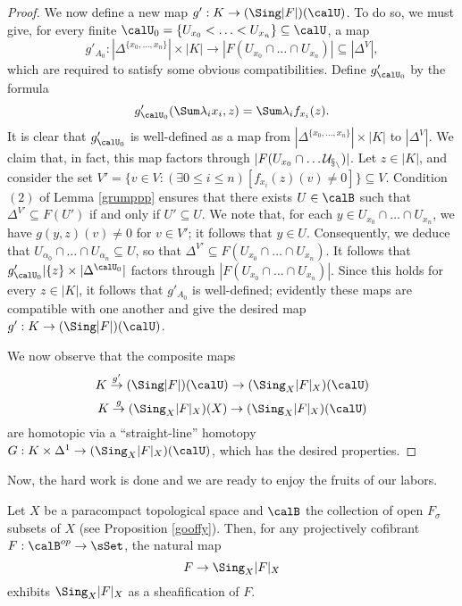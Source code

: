 \begin{proof}
We now define a new map
$g': K \rightarrow (\Sing |F|)(\calU)$. To do so, we must give, for every finite
$\calU_0 = \{ U_{x_0} < \ldots < U_{x_n} \} \subseteq \calU$, a map
$$ g'_{A_0}: |\Delta^{ \{x_0, \ldots, x_n\} }| \times |K| \rightarrow |F(U_{x_0} \cap \ldots \cap U_{x_n})| \subseteq |\Delta^V|,$$
which are required to satisfy some obvious compatibilities. 
Define $g'_{\calU_0}$ by the formula
$$ g'_{\calU_0}( \Sum \lambda_i x_i, z) = \Sum \lambda_i f_{x_i}(z).$$
It is clear that $g'_{\calU_0}$ is well-defined as a map from $| \Delta^{ \{x_0, \ldots, x_n \} } | \times |K|$ to
$| \Delta^{V} |$. We claim that, in fact, this map factors through $| F( U_{x_0} \cap \ldots \cal U_{x_n} )|$. Let $z \in |K|$, and consider the set $V' = \{ v \in V: (\exists 0 \leq i \leq n) [f_{x_i}(z)(v) \neq 0] \} \subseteq V$. Condition $(2)$ of Lemma \ref{grumppp} ensures that there exists $U \in \calB$ such that $\Delta^{V'} \subseteq F(U')$ if and only if
$U' \subseteq U$. We note that, for each $y \in U_{x_0} \cap \ldots \cap U_{x_n}$, we have $g(y,z)(v) \neq 0$ for $v \in V'$; it follows that $y \in U$. Consequently, we deduce that
$U_{\alpha_0} \cap \ldots \cap U_{\alpha_n} \subseteq U$, so that
$\Delta^{V'} \subseteq F( U_{x_0} \cap \ldots \cap U_{x_n} ).$ It follows that
$g'_{\calU_0}| \{z\} \times |\Delta^{\calU_0}|$ factors through $| F(U_{x_0} \cap \ldots \cap U_{x_n} )|$. Since this holds for every $z \in |K|$, it follows that $g'_{A_0}$ is well-defined; evidently these maps are compatible with one another and give the desired map $g': K \rightarrow (\Sing |F|)(\calU)$.

We now observe that the composite maps
$$ K \stackrel{g'}{\rightarrow } (\Sing |F|)(\calU) \rightarrow (\Sing_{X} |F|_X)(\calU)$$
$$ K \stackrel{g}{\rightarrow } (\Sing_X |F|_X)(X) \rightarrow (\Sing_X |F|_X)(\calU)$$
are homotopic via a ``straight-line'' homotopy 
$G: K \times \Delta^1 \rightarrow (\Sing_X |F|_X)(\calU)$, which has the desired properties.
\end{proof}

Now, the hard work is done and we are ready to enjoy the fruits of our labors.

\begin{theorem}\label{main}
Let $X$ be a paracompact topological space and $\calB$ the collection of open
$F_{\sigma}$ subsets of $X$ (see Proposition \ref{gooffy}). Then, for any
projectively cofibrant $F: \calB^{op} \rightarrow \sSet$, the natural map
$$ F \rightarrow \Sing_{X} |F|_X$$ exhibits $\Sing_{X} |F|_X$ as a sheafification of $F$.
\end{theorem}

